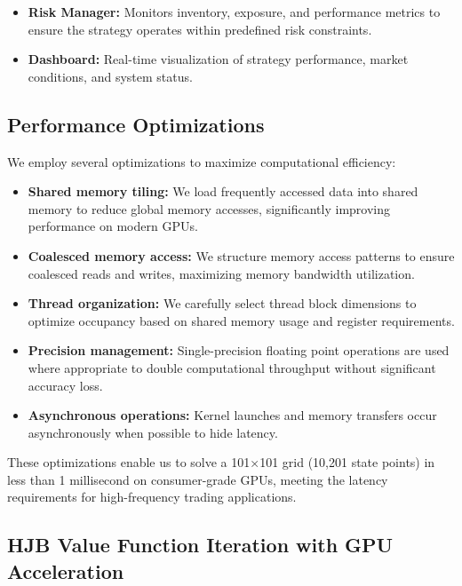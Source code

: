 \documentclass[twocolumn,ieee]{arithmaxresearch}
\begin{document}
\begin{onecolumn}
\begin{onecolumn}
\begin{itemize}
    \item \textbf{Risk Manager:} Monitors inventory, exposure, and performance metrics to ensure the strategy operates within predefined risk constraints.
    
    \item \textbf{Dashboard:} Real-time visualization of strategy performance, market conditions, and system status.
\end{itemize}

\subsection{Performance Optimizations}

We employ several optimizations to maximize computational efficiency:

\begin{itemize}
    \item \textbf{Shared memory tiling:} We load frequently accessed data into shared memory to reduce global memory accesses, significantly improving performance on modern GPUs.
    
    \item \textbf{Coalesced memory access:} We structure memory access patterns to ensure coalesced reads and writes, maximizing memory bandwidth utilization.
    
    \item \textbf{Thread organization:} We carefully select thread block dimensions to optimize occupancy based on shared memory usage and register requirements.
    
    \item \textbf{Precision management:} Single-precision floating point operations are used where appropriate to double computational throughput without significant accuracy loss.
    
    \item \textbf{Asynchronous operations:} Kernel launches and memory transfers occur asynchronously when possible to hide latency.
\end{itemize}

These optimizations enable us to solve a 101×101 grid (10,201 state points) in less than 1 millisecond on consumer-grade GPUs, meeting the latency requirements for high-frequency trading applications.

\subsection{HJB Value Function Iteration with GPU Acceleration}


\end{onecolumn}
\end{onecolumn}
\end{document}
